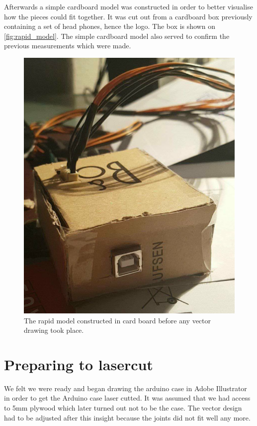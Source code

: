 Afterwards a simple cardboard model was constructed in order to better visualise how the pieces could fit together. It was cut out from a cardboard box previously containing a set of head phones, hence the logo. The box is shown on \autoref{fig:rapid_model}. The simple cardboard model also served to confirm the previous measurements which were made. 


\begin{figure}
\centering
\includegraphics[scale=0.75]{Figure/rapid_model.png}
\caption{The rapid model constructed in card board before any vector drawing took place.}
\label{fig:hinge}
\end{figure}

\section{Preparing to lasercut}
We felt we were ready and began drawing the arduino case in Adobe Illustrator in order to get the Arduino case laser cutted.  It was assumed that we had access to 5mm plywood which later turned out not to be the case. The vector design had to be adjusted after this insight because the joints did not fit well any more. 